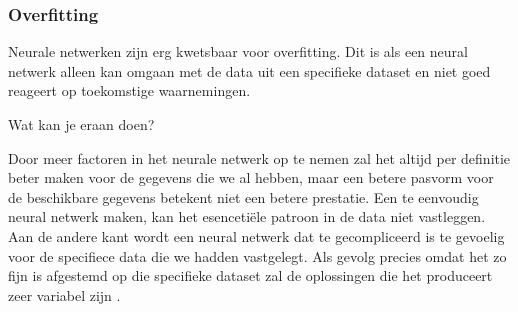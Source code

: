 \subsubsection{Overfitting}
Neurale netwerken zijn erg kwetsbaar voor overfitting. Dit is als een neural netwerk alleen kan omgaan met de data uit een specifieke dataset en niet goed reageert op toekomstige waarnemingen. 

Wat kan je eraan doen?

Door meer factoren in het neurale netwerk op te nemen zal het altijd per definitie beter maken voor de gegevens die we al hebben, maar een betere pasvorm voor de beschikbare gegevens betekent niet een betere prestatie. Een te eenvoudig neural netwerk maken, kan het esencetiële patroon in de data niet vastleggen. Aan de andere kant wordt een neural netwerk dat te gecompliceerd is te gevoelig voor de specifiece data die we hadden vastgelegt. Als gevolg precies omdat het zo fijn is afgestemd op die specifieke dataset zal de oplossingen die het produceert zeer variabel zijn \cite{algoritms}.\\\\
